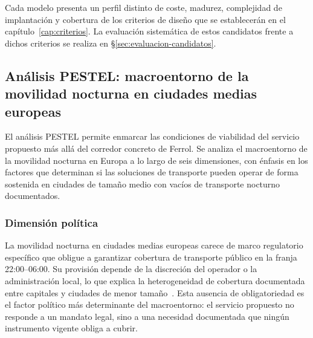 Cada modelo presenta un perfil distinto de coste, madurez,
complejidad de implantación y cobertura de los criterios
de diseño que se establecerán en el capítulo~\ref{cap:criterios}.
La evaluación sistemática de estos candidatos frente a
dichos criterios se realiza en §\ref{sec:evaluacion-candidatos}.




\subsection{Análisis PESTEL: macroentorno de la movilidad nocturna en ciudades medias europeas}
\label{sec:pestel}

El análisis PESTEL permite enmarcar las condiciones de viabilidad del
servicio propuesto más allá del corredor concreto de Ferrol. Se analiza
el macroentorno de la movilidad nocturna en Europa a lo largo de seis dimensiones, con énfasis en los factores que determinan si las soluciones de transporte pueden operar de forma sostenida en ciudades de tamaño medio con vacíos de transporte nocturno documentados.

\subsubsection{Dimensión política}
\label{sec:pestel-politica}

La movilidad nocturna en ciudades medias europeas carece de marco 
regulatorio específico que obligue a garantizar cobertura de 
transporte público en la franja 22:00--06:00. Su provisión 
depende de la discreción del operador o la administración local, 
lo que explica la heterogeneidad de cobertura documentada entre 
capitales y ciudades de menor 
tamaño~\parencite{PlyushetvaBoussauw2020}. Esta ausencia de 
obligatoriedad es el factor político más determinante del 
macroentorno: el servicio propuesto no responde a un mandato 
legal, sino a una necesidad documentada que ningún instrumento 
vigente obliga a cubrir.

